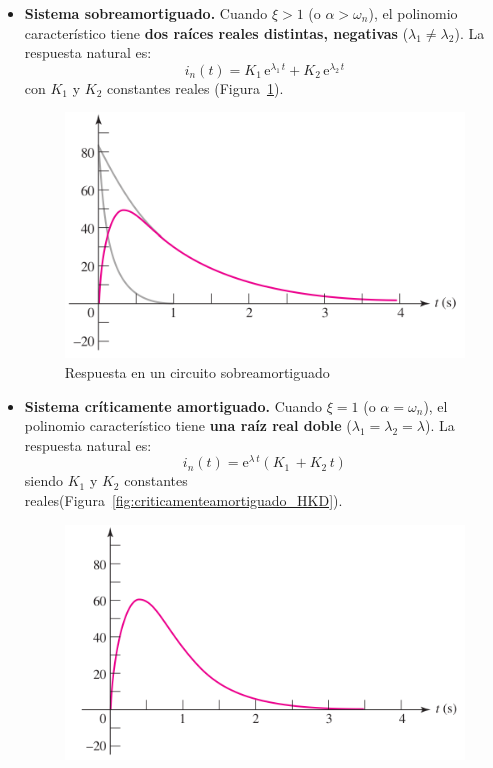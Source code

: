 \begin{itemize}
\item \textbf{Sistema sobreamortiguado.} Cuando $\xi>1$ (o
  $\alpha>\omega_n$), el polinomio característico tiene \textbf{dos
    raíces reales distintas, negativas} ($\lambda_1\neq\lambda_2$). La
  respuesta natural es:
  \begin{equation*}
    i_n(t)=K_1\,\mathrm{e}^{\lambda_1\,t}+K_2\,\mathrm{e}^{\lambda_2\,t}   
  \end{equation*}
  con $K_1$ y $K_2$ constantes reales
  (Figura~\ref{fig:sobreamortiguado_HKD}).
  \begin{figure}[H]
    \centering \includegraphics{../figs/Sobreamortiguado_HKD.pdf}
    \caption{Respuesta en un circuito sobreamortiguado}
    \label{fig:sobreamortiguado_HKD}
  \end{figure}
\item \textbf{Sistema críticamente amortiguado.} Cuando $\xi=1$ (o
  $\alpha=\omega_n$), el polinomio característico tiene \textbf{una
    raíz real doble} ($\lambda_1=\lambda_2=\lambda$). La respuesta
  natural es:
  \begin{equation*}
    i_n(t)=\mathrm{e}^{\lambda\,t}(K_1\,+K_2\,t)   
  \end{equation*}
  siendo $K_1$ y $K_2$ constantes
  reales(Figura~\ref{fig:criticamenteamortiguado_HKD}).
  \begin{figure}[H]
    \centering
    \includegraphics{../figs/AmortiguamientoCritico_HKD.pdf}

\end{figure}
\end{itemize}
